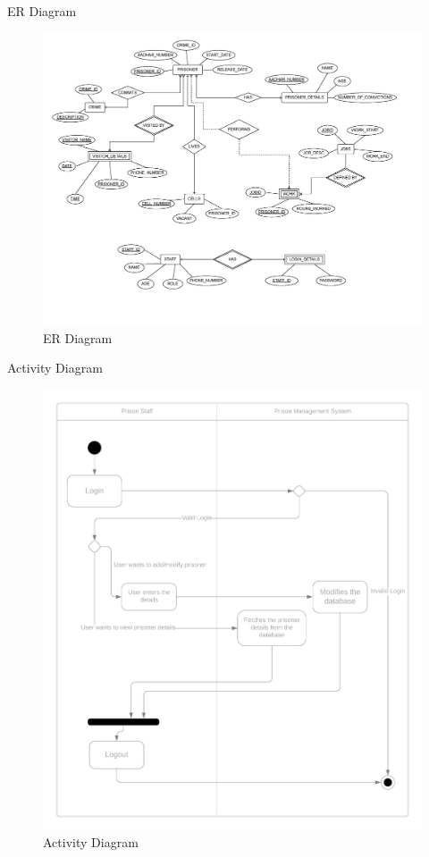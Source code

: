 \documentclass[aspectratio=169]{beamer}
\begin{document}
\begin{frame}{ER Diagram}
    \begin{figure}
        \centering
        \includegraphics[scale=0.23]{er.png}
        \caption{ER Diagram}
        \label{fig:er}
    \end{figure}
\end{frame}

\begin{frame}{Activity Diagram}
    \begin{figure}
        \centering
        \includegraphics[scale=0.05]{activity.png}
        \caption{Activity Diagram}
        \label{fig:activity}
    \end{figure}
\end{frame}
\end{document}
